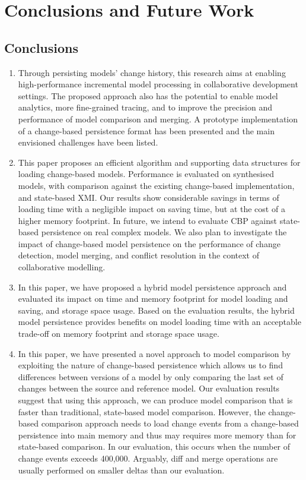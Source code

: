 \chapter{Conclusions and Future Work}

\section{Conclusions}

\begin{enumerate}
\item Through persisting models' change history, this research aims at enabling high-performance incremental model processing in collaborative development settings. The proposed approach also has the potential to enable model analytics, more fine-grained tracing, and to improve the precision and performance of model comparison and merging. A prototype implementation of a change-based persistence format has been presented and the main envisioned challenges have been listed. 
\item This paper proposes an efficient algorithm and supporting data structures for loading change-based models.  Performance is evaluated on synthesised models, with comparison against the existing change-based implementation, and state-based XMI. Our results show considerable savings in terms of loading time with a negligible impact on saving time, but at the cost of a higher memory footprint.  In future, we intend to evaluate CBP against state-based persistence on real complex models.  We also plan to investigate the impact of change-based model persistence on the performance of change detection, model merging, and conflict resolution in the context of collaborative modelling. 
\item In this paper, we have proposed a hybrid model persistence approach and evaluated its impact on time and memory footprint for model loading and saving, and storage space usage.
Based on the evaluation results, the hybrid model persistence provides benefits on model loading time 
with an acceptable trade-off on memory footprint and storage space usage. 
\item In this paper, we have presented a novel approach to model comparison by exploiting the nature of change-based persistence which allows us to find differences between versions of a model by only comparing the last set of changes between the source and reference model.
Our evaluation results suggest that using this approach, we can produce model comparison that is faster than traditional, state-based model comparison.
However, the change-based comparison approach needs to load change events from a change-based persistence into main memory and thus may requires more memory than for state-based comparison. In our evaluation, this occurs when the number of change events exceeds 400,000.
Arguably, diff and merge operations are usually performed on smaller deltas than our evaluation.
\end{enumerate}


